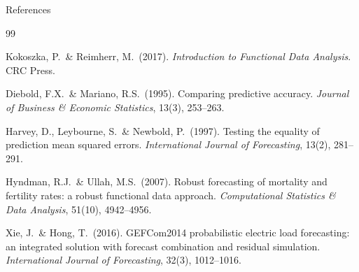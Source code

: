\documentclass[10pt,aspectratio=169]{beamer}
\begin{document}
\begin{frame}{References}
  \footnotesize
  \begin{thebibliography}{99}

    Kokoszka, P.\ \& Reimherr, M.\ (2017).
    \textit{Introduction to Functional Data Analysis}. CRC Press.

    Diebold, F.X.\ \& Mariano, R.S.\ (1995).
    Comparing predictive accuracy.
    \textit{Journal of Business \& Economic Statistics}, 13(3), 253--263.

    Harvey, D., Leybourne, S.\ \& Newbold, P.\ (1997).
    Testing the equality of prediction mean squared errors.
    \textit{International Journal of Forecasting}, 13(2), 281--291.

    Hyndman, R.J.\ \& Ullah, M.S.\ (2007).
    Robust forecasting of mortality and fertility rates:
    a robust functional data approach.
    \textit{Computational Statistics \& Data Analysis}, 51(10), 4942--4956.

    Xie, J.\ \& Hong, T.\ (2016).
    GEFCom2014 probabilistic electric load forecasting:
    an integrated solution with forecast combination and residual simulation.
    \textit{International Journal of Forecasting}, 32(3), 1012--1016.

  \end{thebibliography}
\end{frame}
\end{document}
